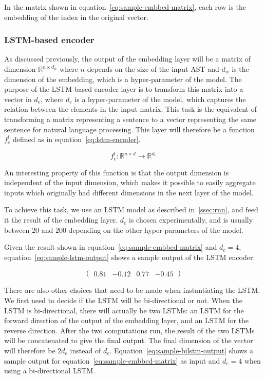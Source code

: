 In the matrix shown in equation~\ref{eq:sample-embbed-matrix}, each row is the
embedding of the index in the original vector.
%
\subsubsection{\label{sssec:lstm-encoder}LSTM-based encoder}
As discussed previously, the output of the embedding layer will be a matrix of
dimension $\mathbb{R}^{n\times d_w}$ where $n$ depends on the size of
the input AST and $d_w$ is the dimension of the embedding, which is a
hyper-parameter of the model. The purpose of the LSTM-based encoder layer is to
transform this matrix into a vector in $d_e$, where $d_e$ is a hyper-parameter of
the model, which captures the relation between the elements in the input matrix.
This task is the equivalent of transforming a matrix representing a sentence to
a vector representing the same sentence for natural language processing.
This layer will therefore be a function $f_e^l$ defined as in
equation~\ref{eq:lstm-encoder}.

\begin{equation}
  \label{eq:lstm-encoder}
  f_e^l : \mathbb{R}^{n\times d} \rightarrow \mathbb{R}^{d_e}
\end{equation}

An interesting property of this function is that the output dimension is
independent of the input dimension, which makes it possible to easily aggregate
inputs which originally had different dimensions in the next layer of the model.

To achieve this task, we use an LSTM model as described in~\ref{ssec:rnn}, and
feed it the result of the embedding layer. $d_e$ is chosen experimentally, and is
usually between $20$ and $200$ depending on the other hyper-parameters of the
model.

Given the result shown in equation~\ref{eq:sample-embbed-matrix} and $d_e = 4$,
equation~\ref{eq:sample-lstm-output} shows a sample output of the LSTM encoder.

\begin{equation}
  \label{eq:sample-lstm-output}
  \begin{pmatrix}
    0.81 & -0.12 & 0.77 & -0.45
  \end{pmatrix}
\end{equation}

There are also other choices that need to be made when instantiating the
LSTM. We first need to decide if the LSTM will be bi-directional or not. When
the LSTM is bi-directional, there will actually be two LSTMs: an LSTM for the
forward direction of the output of the embedding layer, and an LSTM for the
reverse direction. After the two computations run, the result of the two LSTMs
will be concatenated to give the final output. The final dimension of the vector
will therefore be $2d_e$ instead of $d_e$. Equation~\ref{eq:sample-bilstm-output}
shows a sample output for equation~\ref{eq:sample-embbed-matrix} as input and
$d_e = 4$ when using a bi-directional LSTM.


